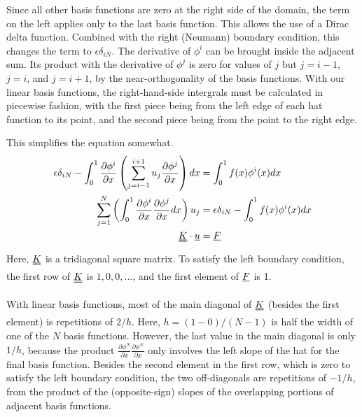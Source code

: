 \documentclass[10pt]{article}
\begin{document}
Since all other basis functions are zero at the right side of the domain, the term on the left applies only to the last basis function. This allows the use of a Dirac delta function. Combined with the right (Neumann) boundary condition, this changes the term to $\epsilon \delta_{iN}$.
The derivative of $\phi^i$ can be brought inside the adjacent sum. Its product with the derivative of $\phi^j$ is zero for values of $j$ but $j=i-1$, $j=i$, and $j=i+1$, by the near-orthogonality of the basis functions. With our linear basis functions, the right-hand-side intergrals must be calculated in piecewise fashion, with the first piece being from the left edge of each hat function to its point, and the second piece being from the point to the right edge.

\pagebreak

This simplifies the equation somewhat.
\begin{equation}
    \label{eqn:tosolve-sum}
    \begin{split}
        \epsilon \delta_{iN} - \int_0^1 \frac{\partial \phi^i}{\partial x} \left( \sum_{j=i-1}^{i+1}u_j \frac{\partial \phi^j}{\partial x} \right) dx &= \int_0^1 f(x) \phi^i(x)dx \\
        \sum_{j=1}^{N} \left(
                \int_0^1 \frac{\partial \phi^i}{\partial x} \frac{\partial \phi^j}{\partial x} dx 
        \right) u_j &= \epsilon \delta_{iN} - \int_0^1 f(x)\phi^i(x)dx \\
        \uuline{K} \cdot \uline{u} &= \uline{F} 
    \end{split}
\end{equation}
Here, $\uuline{K}$ is a tridiagonal square matrix. To satisfy the left boundary condition, the first row of $\uuline{K}$ is $1, 0, 0, ...$, and the first element of $\uline F$ is 1.

With linear basis functions, most of the main diagonal of $\uuline K$ (besides the first element) is repetitions of $2 / h$. Here, $h = (1 - 0) / (N - 1)$ is half the width of one of the $N$ basis functions. However, the last value in the main diagonal is only $1/h$, because the product $\frac{\partial \phi^N}{\partial x} \frac{\partial \phi^N}{\partial x}$ only involves the left slope of the hat for the final basis function. Besides the second element in the first row, which is zero to satisfy the left boundary condition, the two off-diagonals are repetitions of $-1 / h$, from the product of the (opposite-sign) slopes of the overlapping portions of adjacent basis functions.
\end{document}
